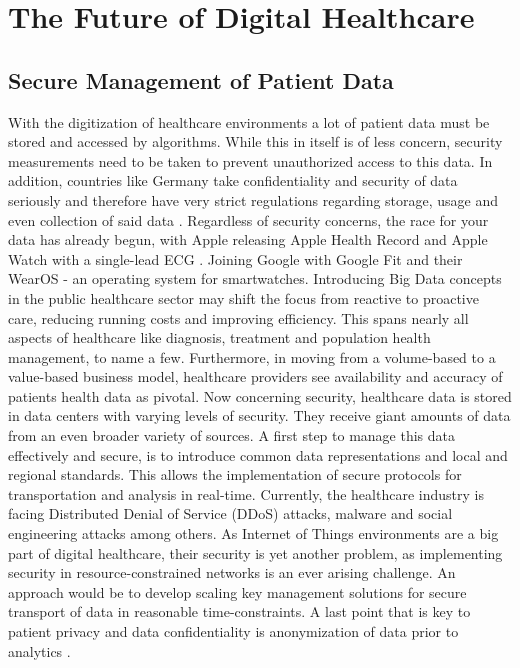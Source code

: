\section{The Future of Digital Healthcare}
\subsection{Secure Management of Patient Data}
With the digitization of healthcare environments a lot of patient data must be stored and accessed by algorithms. While this in itself is of less concern, security measurements need to be taken to prevent unauthorized access to this data. In addition, countries like Germany take confidentiality and security of data seriously and therefore have very strict regulations regarding storage, usage and even collection of said data \cite{dsgvo}. Regardless of security concerns, the race for your data has already begun, with Apple releasing Apple Health Record and Apple Watch with a single-lead ECG \cite{appleHealth}. Joining Google with Google Fit and their WearOS - an operating system for smartwatches. Introducing Big Data concepts in the public healthcare sector may shift the focus from reactive to proactive care, reducing running costs and improving efficiency. This spans nearly all aspects of healthcare like diagnosis, treatment and population health management, to name a few. Furthermore, in moving from a volume-based to a value-based business model, healthcare providers see availability and accuracy of patients health data as pivotal. Now concerning security, healthcare data is stored in data centers with varying levels of security. They receive giant amounts of data from an even broader variety of sources. A first step to manage this data effectively and secure, is to introduce common data representations and local and regional standards. This allows the implementation of secure protocols for transportation and analysis in real-time. Currently, the healthcare industry is facing Distributed Denial of Service (DDoS) attacks, malware and social engineering attacks among others. As Internet of Things environments are a big part of digital healthcare, their security is yet another problem, as implementing security in resource-constrained networks is an ever arising challenge. An approach would be to develop scaling key management solutions for secure transport of data in reasonable time-constraints. A last point that is key to patient privacy and data confidentiality is anonymization of data prior to analytics \cite{patil2014big}.
